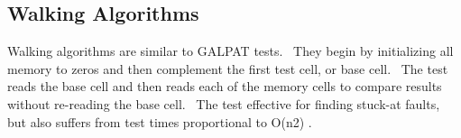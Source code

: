 \subsection{Walking Algorithms}
Walking algorithms are similar to GALPAT tests.  They begin by initializing all memory to zeros and then complement the first test cell, or base cell.  The test reads the base cell and then reads each of the memory cells to compare results without re-reading the base cell.  The test effective for finding stuck-at faults, but also suffers from test times proportional to O(n2) \cite{oldref-10}.  

